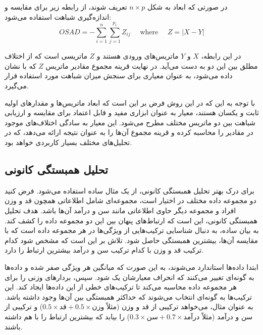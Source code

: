 در صورتی که ابعاد به شکل \( n \times p \) تعریف شوند، از رابطه زیر برای مقایسه و اندازه‌گیری شباهت استفاده می‌شود:
\begin{equation}
	OSAD = -\sum_{i=1}^n \sum_{j=1}^{p_1} Z_{ij}
	\quad \text { where } \quad
	Z = |X-Y|
\end{equation}

در این رابطه، \( X \) و \( Y \) ماتریس‌های ورودی هستند و \( Z \) ماتریسی است که از اختلاف مطلق بین این دو به دست می‌آید. در نهایت قرینه مجموع مقادیر ماتریس \( Z \) که با
نشان داده می‌شود، به عنوان معیاری برای سنجش میزان شباهت مورد استفاده قرار می‌گیرد.

با توجه به این که در این روش فرض بر این است که ابعاد ماتریس‌ها و مقدار‌های اولیه ثابت و یکسان هستند، معیار
به عنوان ابزاری مفید و قابل اعتماد برای مقایسه و ارزیابی شباهت بین دو ماتریس مختلف مطرح می‌شود. این معیار به سادگی اختلاف‌های موجود در مقادیر را محاسبه کرده و قرینه مجموع آن‌ها را به عنوان نتیجه ارائه می‌دهد، که در تحلیل‌های مختلف بسیار کاربردی خواهد بود.




\subsection{
	تحلیل همبستگی کانونی%
}
برای درک بهتر تحلیل همبستگی کانونی، از یک مثال ساده استفاده می‌شود. فرض کنید دو مجموعه داده مختلف در اختیار است، مجموعه‌ای شامل اطلاعاتی همچون قد و وزن افراد و مجموعه دیگر حاوی اطلاعاتی مانند سن و درآمد آن‌ها باشد. هدف تحلیل همبستگی کانونی، این است که ارتباط‌های پنهان بین این دو مجموعه داده را کشف کند. به بیان ساده،
به دنبال شناسایی ترکیب‌هایی از ویژگی‌ها در هر مجموعه داده است که با مقایسه آن‌ها، بیشترین همبستگی حاصل شود. تلاش بر این است که مشخص شود کدام ترکیب قد و وزن با کدام ترکیب سن و درآمد بیشترین ارتباط را دارد.

ابتدا داده‌ها استاندارد می‌شوند، به این صورت که میانگین هر ویژگی صفر شده و داده‌ها به گونه‌ای تغییر می‌کنند که انحراف معیارشان یک شود. سپس،
بردارهای وزنی را برای هر مجموعه داده محاسبه می‌کند تا ترکیب‌های خطی از این داده‌ها ایجاد کند. این ترکیب‌ها به گونه‌ای انتخاب می‌شوند که حداکثر همبستگی بین آن‌ها وجود داشته باشد. به عنوان مثال،
می‌خواهد ترکیبی از قد و وزن (مثلاً \(0.5 \times \text{قد} + 0.5 \times \text{وزن}\)) و ترکیبی از سن و درآمد (مثلاً \(0.3 \times \text{سن} + 0.7 \times \text{درآمد}\)) را بیابد که بیشترین ارتباط را با هم داشته باشند.

